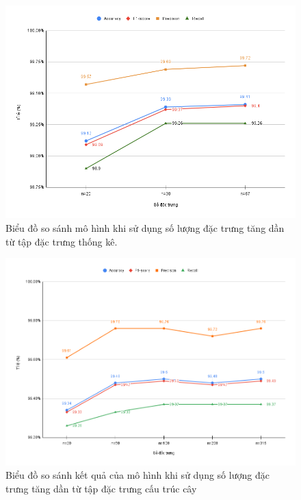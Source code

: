 \documentclass[./../main.tex]{subfiles}
\begin{document}
\begin{figure}[H]
	\centering
	\includegraphics[width=\linewidth]{./images/exp1_top_all_general_feat.png}
	\caption{Biểu đồ so sánh mô hình khi sử dụng số lượng đặc trưng tăng dần từ tập đặc trưng thống kê.}
	\label{fig:exp1_top_all_general_feat}
\end{figure}

\begin{figure}[H]
	\centering
	\includegraphics[width=\linewidth]{./images/exp1_top_all_structual_path.png}
	\caption{Biểu đồ so sánh kết quả của mô hình khi sử dụng số lượng đặc trưng tăng dần từ tập đặc trưng cấu trúc cây}
	\label{fig:exp1_top_all_structual_path}
\end{figure}
\end{document}
